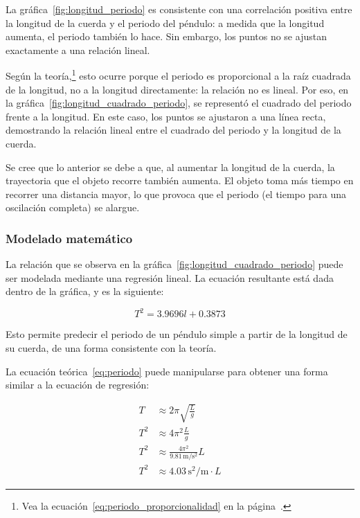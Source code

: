 \documentclass[letterpaper]{report}
\numberwithin{table}{section}
\begin{document}
La gráfica~\ref{fig:longitud_periodo} es consistente con una
correlación positiva entre la longitud de la cuerda y el periodo del
péndulo: a medida que la longitud aumenta, el periodo también lo hace. Sin
embargo, los puntos no se ajustan exactamente a una relación lineal.

Según la teoría,\footnote{Vea la
  ecuación~\eqref{eq:periodo_proporcionalidad} en la
página~\pageref{eq:periodo_proporcionalidad}.} esto ocurre porque el periodo es
proporcional a la raíz cuadrada de la longitud, no a la longitud
directamente: la relación no es lineal. Por eso, en la
gráfica~\ref{fig:longitud_cuadrado_periodo}, se representó el
cuadrado del periodo frente a la longitud. En este caso, los puntos
se ajustaron a una línea recta, demostrando la relación lineal entre
el cuadrado del periodo y la longitud de la cuerda.

Se cree que lo anterior se debe a que, al aumentar la longitud de la cuerda, la
trayectoria que el objeto recorre también aumenta. El objeto toma más
tiempo en recorrer una distancia mayor, lo que provoca que el periodo
(el tiempo para una oscilación completa) se alargue.

\subsubsection{Modelado matemático}

La relación que se observa en la gráfica~\ref{fig:longitud_cuadrado_periodo}
puede ser modelada mediante una regresión lineal. La ecuación resultante está
dada dentro de la gráfica, y es la siguiente:

\begin{equation}
  T^{2} = 3.9696l + 0.3873
\end{equation}

Esto permite predecir el periodo de un péndulo simple a partir de la longitud de
su cuerda, de una forma consistente con la teoría.

La ecuación teórica~\eqref{eq:periodo} puede manipularse para obtener una forma
similar a la ecuación de regresión:

\begin{align*}
  T &\approx 2\pi\sqrt{\frac{L}{g}} \\
  T^{2} &\approx 4\pi^{2}\frac{L}{g} \\
  T^{2} &\approx \frac{4\pi^{2}}{9.81\,\text{m/s$^{2}$}}L \\
  T^{2} &\approx 4.03\,\text{s$^{2}$/m} \cdot L
\end{align*}
\end{document}
